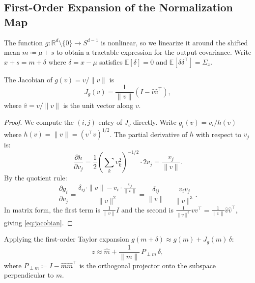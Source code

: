 \subsection{First-Order Expansion of the Normalization Map}

The function $g\colon \mathbb{R}^d \setminus \{0\} \to S^{d-1}$ is nonlinear, so we linearize it around the shifted mean $m \coloneqq \mu + s$ to obtain a tractable expression for the output covariance.
Write $x + s = m + \delta$ where $\delta = x - \mu$ satisfies $\mathbb{E}[\delta] = 0$ and $\mathbb{E}[\delta\delta^\top] = \Sigma_x$.

\begin{lemma}
\label{lem:jacobian}
The Jacobian of $g(v) = v / \|v\|$ is
\begin{equation}
  J_g(v) = \frac{1}{\|v\|}\left(I - \hat{v}\hat{v}^\top\right),
  \label{eq:jacobian}
\end{equation}
where $\hat{v} = v / \|v\|$ is the unit vector along $v$.
\end{lemma}

\begin{proof}
We compute the $(i,j)$-entry of $J_g$ directly.
Write $g_i(v) = v_i / h(v)$ where $h(v) = \|v\| = (v^\top v)^{1/2}$.
The partial derivative of $h$ with respect to $v_j$ is:
%
\begin{equation}
  \frac{\partial h}{\partial v_j}
  = \frac{1}{2}\left(\sum_k v_k^2\right)^{-1/2} \cdot 2v_j
  = \frac{v_j}{\|v\|}.
\end{equation}
%
By the quotient rule:
%
\begin{equation}
  \frac{\partial g_i}{\partial v_j}
  = \frac{\delta_{ij} \cdot \|v\| - v_i \cdot \frac{v_j}{\|v\|}}{\|v\|^2}
  = \frac{\delta_{ij}}{\|v\|} - \frac{v_i v_j}{\|v\|^3}.
\end{equation}
%
In matrix form, the first term is $\frac{1}{\|v\|}I$ and the second is $\frac{1}{\|v\|^3}vv^\top = \frac{1}{\|v\|}\hat{v}\hat{v}^\top$, giving \eqref{eq:jacobian}.
\end{proof}

Applying the first-order Taylor expansion $g(m + \delta) \approx g(m) + J_g(m)\,\delta$:
%
\begin{equation}
  z \approx \hat{m} + \frac{1}{\|m\|}\,P_{\perp m}\,\delta,
  \label{eq:taylor}
\end{equation}
%
where $P_{\perp m} \coloneqq I - \hat{m}\hat{m}^\top$ is the orthogonal projector onto the subspace perpendicular to $m$.

